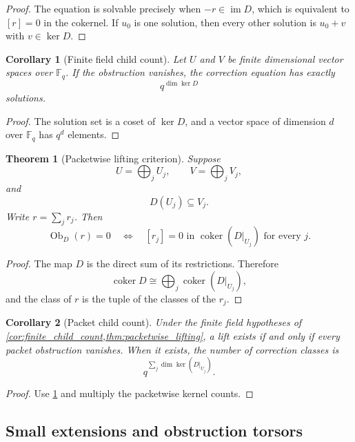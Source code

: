 \documentclass{aomart}
\newtheorem{theorem}{Theorem}[section]
\newtheorem{corollary}[corollary]{Corollary}
\theoremstyle{definition}
\theoremstyle{remark}
\newcommand{\FF}{\mathbb F}
\newcommand{\coker}{\operatorname{coker}}
\newcommand{\im}{\operatorname{im}}
\newcommand{\Ob}{\operatorname{Ob}}
\begin{document}
\begin{proof}
The equation is solvable precisely when \(-r\in\im D\), which is equivalent to \([r]=0\) in the cokernel. If \(u_0\) is one solution, then every other solution is \(u_0+v\) with \(v\in\ker D\).
\end{proof}

\begin{corollary}[Finite field child count]\label{cor:finite_child_count}
Let \(U\) and \(V\) be finite dimensional vector spaces over \(\FF_q\). If the obstruction vanishes, the correction equation has exactly
\[
\boxed{
q^{\dim\ker D}
}
\]
solutions.
\end{corollary}

\begin{proof}
The solution set is a coset of \(\ker D\), and a vector space of dimension \(d\) over \(\FF_q\) has \(q^d\) elements.
\end{proof}

\begin{theorem}[Packetwise lifting criterion]\label{thm:packetwise_lifting}
Suppose
\[
U=\bigoplus_jU_j,
\qquad
V=\bigoplus_jV_j,
\]
and
\[
D(U_j)\subseteq V_j.
\]
Write \(r=\sum_jr_j\). Then
\[
\boxed{
\Ob_D(r)=0
\quad\Longleftrightarrow\quad
[r_j]=0\text{ in }\coker(D|_{U_j})
\text{ for every }j.
}
\]
\end{theorem}

\begin{proof}
The map \(D\) is the direct sum of its restrictions. Therefore
\[
\coker D
\cong
\bigoplus_j\coker(D|_{U_j}),
\]
and the class of \(r\) is the tuple of the classes of the \(r_j\).
\end{proof}

\begin{corollary}[Packet child count]\label{cor:packet_child_count}
Under the finite field hypotheses of \cref{cor:finite_child_count,thm:packetwise_lifting}, a lift exists if and only if every packet obstruction vanishes. When it exists, the number of correction classes is
\[
\boxed{
q^{\sum_j\dim\ker(D|_{U_j})}.
}
\]
\end{corollary}

\begin{proof}
Use \cref{thm:packetwise_lifting} and multiply the packetwise kernel counts.
\end{proof}

\subsection{Small extensions and obstruction torsors}
\end{document}
